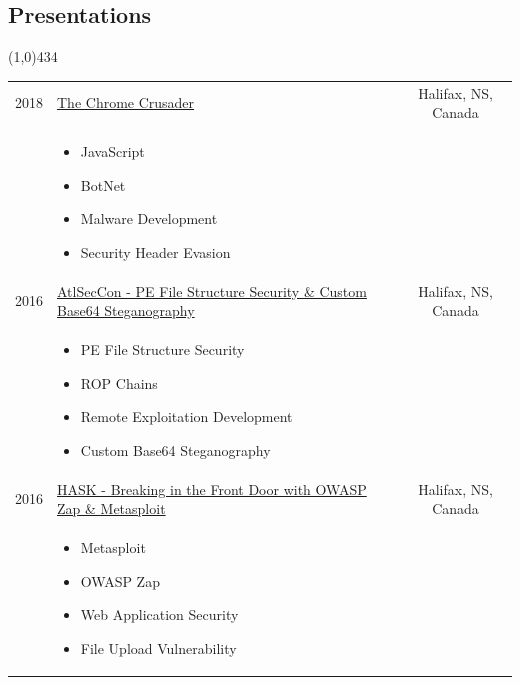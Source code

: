 \documentclass{res}
\newcommand{\frstCVcell}{2.5cm}
\begin{document}
\begin{resume}
  \pagebreak
  \section{Presentations}
  \line(1,0){434}
  \newline
  \newline
  \begin{tabularx}{\textwidth}{p{\frstCVcell}Xc}
    2018 & \href{https://speakerdeck.com/lillypad/the-chrome-crusader}{The Chrome Crusader} & Halifax, NS, Canada\\
    &
    \begin{itemize}
    \item JavaScript
    \item BotNet
    \item Malware Development
    \item Security Header Evasion
    \end{itemize}
    & \\
    2016 & \href{https://speakerdeck.com/lillypad/pe-file-structure-security-and-custom-base-64-steganography}{AtlSecCon - PE File Structure Security \& Custom Base64 Steganography} & Halifax, NS, Canada\\
    &
    \begin{itemize}
    \item PE File Structure Security
    \item ROP Chains
    \item Remote Exploitation Development
    \item Custom Base64 Steganography
    \end{itemize}
    & \\
    2016 & \href{https://speakerdeck.com/lillypad/breaking-in-the-front-door-with-owasp-zap-and-metasploit}{HASK - Breaking in the Front Door with OWASP Zap \& Metasploit} & Halifax, NS, Canada\\
    &
    \begin{itemize}
    \item Metasploit
    \item OWASP Zap
    \item Web Application Security
    \item File Upload Vulnerability
    \end{itemize}
    & \\
  \end{tabularx}
  
  \pagebreak

\end{resume}
\end{document}
